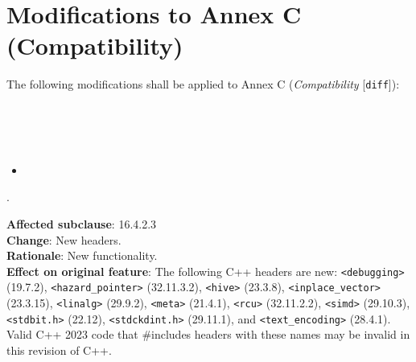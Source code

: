 \section{Modifications to Annex C (Compatibility)}

The following modifications shall be applied to Annex C (\emph{Compatibility}
[\texttt{diff}]):

\begin{removal}
\\
\\
\\

\begin{itemize}[label=\textemdash]

\item
{}

\end{itemize}

.
\end{removal}

\begin{modification}
\textbf{Affected subclause}: 16.4.2.3\\
\textbf{Change}: New headers.\\
\textbf{Rationale}: New functionality.\\
\textbf{Effect on original feature}: The following C++ headers are new:
 \texttt{<debugging>}
(19.7.2), \texttt{<hazard\_pointer>} (32.11.3.2), \texttt{<hive>} (23.3.8),
\texttt{<inplace\_vector>} (23.3.15), \texttt{<linalg>} (29.9.2),
\texttt{<meta>} (21.4.1), \texttt{<rcu>} (32.11.2.2), \texttt{<simd>} (29.10.3),
\texttt{<stdbit.h>} (22.12), \texttt{<stdckdint.h>} (29.11.1), and
\texttt{<text\_encoding>} (28.4.1). Valid C++ 2023 code that \#includes headers with these names may be invalid
in this revision of C++.
\end{modification}
